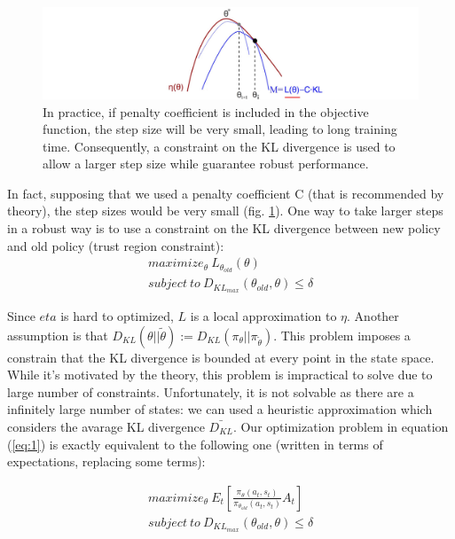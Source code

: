 \documentclass[11pt]{article}
\begin{document}
\begin{figure}[t]
        \includegraphics[width=15cm]{functions2}
        \centering
        \caption{In practice, if penalty coefficient is included in the objective function,
        the step size will be very small, leading to long training time.
        Consequently, a constraint on the KL divergence is used to allow a larger step size
        while guarantee robust performance.
        }
        \label{fig:functions2}
\end{figure}
In fact, supposing that we used a penalty coefficient C (that is recommended by theory),
the step sizes would be very small (fig. \ref{fig:functions2}). One way to take larger
steps in a robust way is to use a constraint on the KL divergence between new policy and
old policy (trust region constraint):
\begin{equation}
        \begin{split}
        maximize_{\theta} \ L_{\theta_{old}}(\theta)
        \\ \label{eq:1}
        subject \  to \ D_{KL_{max}}(\theta_{old}, \theta) \leq \delta
        \end{split}
\end{equation}

Since $eta$ is hard to optimized, $L$ is a local approximation to $\eta$. Another
assumption is that $D_{KL}(\theta|| \tilde{\theta}) :=
D_{KL}(\pi_{\theta}||\pi_{\tilde{\theta}})$. This problem imposes a constrain that the KL
divergence is bounded at every point in the state space. While it's motivated by the
theory, this problem is impractical to solve due to large number of constraints.
Unfortunately, it is not solvable as there are a infinitely large number of
states: we can used a heuristic approximation which considers the avarage KL
divergence $\bar{D_{KL}}$. Our optimization problem in equation (\ref{eq:1}) is exactly
equivalent to the following one (written in terms of expectations, replacing some terms):

\begin{equation}
        \begin{split}
        maximize_{\theta} \ E_t[\frac{\pi_{\theta}(a_t, s_t)}{\pi_{\theta_{old}}(a_t, s_t)}A_t]
        \\ \label{eq:2}
        subject \  to \ D_{KL_{max}}(\theta_{old}, \theta) \leq \delta
        \end{split}
\end{equation}
\end{document}
